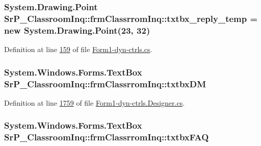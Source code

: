 \hypertarget{class_sr_p___classroom_inq_1_1frm_classrrom_inq_a0b175596cb83997b38795ee916c978f1}{
\subsubsection[{txtbx\-\_\-reply\-\_\-temp}]{\setlength{\rightskip}{0pt plus 5cm}\-System.\-Drawing.\-Point {\bf \-Sr\-P\-\_\-\-Classroom\-Inq\-::frm\-Classrrom\-Inq\-::txtbx\-\_\-reply\-\_\-temp} = new \-System.\-Drawing.\-Point(23, 32)}}
\label{class_sr_p___classroom_inq_1_1frm_classrrom_inq_a0b175596cb83997b38795ee916c978f1}


\-Definition at line \hyperlink{_form1-dyn-ctrls_8cs_source_l00159}{159} of file \hyperlink{_form1-dyn-ctrls_8cs_source}{\-Form1-\/dyn-\/ctrls.\-cs}.

\hypertarget{class_sr_p___classroom_inq_1_1frm_classrrom_inq_aec9084c69e8f5c7398f201a074db8550}{
\subsubsection[{txtbx\-D\-M}]{\setlength{\rightskip}{0pt plus 5cm}\-System.\-Windows.\-Forms.\-Text\-Box {\bf \-Sr\-P\-\_\-\-Classroom\-Inq\-::frm\-Classrrom\-Inq\-::txtbx\-D\-M}}}
\label{class_sr_p___classroom_inq_1_1frm_classrrom_inq_aec9084c69e8f5c7398f201a074db8550}


\-Definition at line \hyperlink{_form1-dyn-ctrls_8_designer_8cs_source_l01759}{1759} of file \hyperlink{_form1-dyn-ctrls_8_designer_8cs_source}{\-Form1-\/dyn-\/ctrls.\-Designer.\-cs}.

\hypertarget{class_sr_p___classroom_inq_1_1frm_classrrom_inq_a891afdbfba3ee4c1b690b938693ecabe}{
\subsubsection[{txtbx\-F\-A\-Q}]{\setlength{\rightskip}{0pt plus 5cm}\-System.\-Windows.\-Forms.\-Text\-Box {\bf \-Sr\-P\-\_\-\-Classroom\-Inq\-::frm\-Classrrom\-Inq\-::txtbx\-F\-A\-Q}}}
\label{class_sr_p___classroom_inq_1_1frm_classrrom_inq_a891afdbfba3ee4c1b690b938693ecabe}


